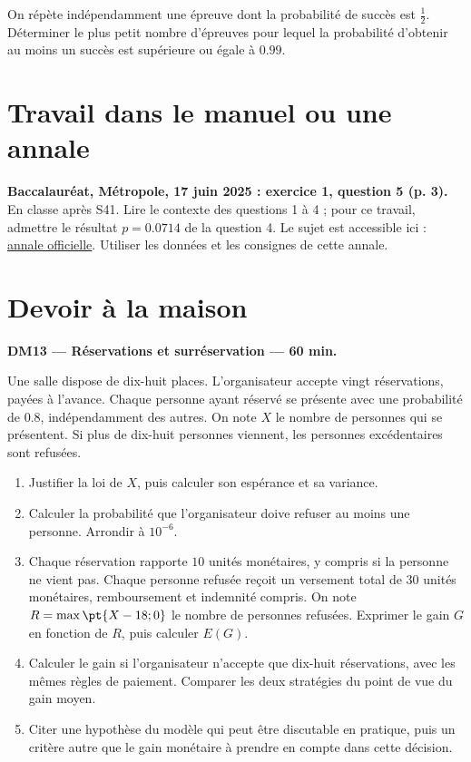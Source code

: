 On répète indépendamment une épreuve dont la probabilité de succès est $\frac12$. Déterminer le plus petit nombre d'épreuves pour lequel la probabilité d'obtenir au moins un succès est supérieure ou égale à $\num{0,99}$.

\section{Travail dans le manuel ou une annale}\textbf{Baccalauréat, Métropole, 17 juin 2025 : exercice 1, question 5 (p. 3).} En classe après S41. Lire le contexte des questions 1 à 4 ; pour ce travail, admettre le résultat $p=\num{0,0714}$ de la question 4. Le sujet est accessible ici : \href{https://www.education.gouv.fr/sites/default/files/2025-06/baccalaur-at-g-n-ral-2025-math-matiques-440856.pdf}{annale officielle}. Utiliser les données et les consignes de cette annale.

\mxnewpage
\section{Devoir à la maison}\textbf{DM13 --- Réservations et surréservation --- 60 min.}\par Une salle dispose de dix-huit places. L'organisateur accepte vingt réservations, payées à l'avance. Chaque personne ayant réservé se présente avec une probabilité de $\num{0,8}$, indépendamment des autres. On note $X$ le nombre de personnes qui se présentent. Si plus de dix-huit personnes viennent, les personnes excédentaires sont refusées.
\begin{enumerate}\item Justifier la loi de $X$, puis calculer son espérance et sa variance.
\item Calculer la probabilité que l'organisateur doive refuser au moins une personne. Arrondir à $10^{-6}$.
\item Chaque réservation rapporte $10$ unités monétaires, y compris si la personne ne vient pas. Chaque personne refusée reçoit un versement total de $30$ unités monétaires, remboursement et indemnité compris. On note $R=\max\pt{X-18;0}$ le nombre de personnes refusées. Exprimer le gain $G$ en fonction de $R$, puis calculer $E(G)$.
\item Calculer le gain si l'organisateur n'accepte que dix-huit réservations, avec les mêmes règles de paiement. Comparer les deux stratégies du point de vue du gain moyen.
\item Citer une hypothèse du modèle qui peut être discutable en pratique, puis un critère autre que le gain monétaire à prendre en compte dans cette décision.\end{enumerate}


